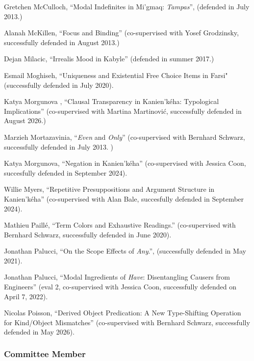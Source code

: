 \documentclass[11pt]{article}
\begin{document}

Gretchen McCulloch, ``Modal Indefinites in Mi'gmaq: \textit{Tampas}'', (defended in July 2013.)

Alanah McKillen, ``Focus and Binding'' (co-supervised with Yosef
Grodzinsky, successfully defended in August 2013.)

Dejan Milacic, ``Irrealis Mood in Kabyle'' (defended in summer 2017.)

Esmail Moghiseh, ``Uniqueness and Existential Free Choice Items in Farsi" (successfully defended in July 2020).


Katya Morgunova , ``Clausal Transparency in Kanien'k\'{e}ha:
Typological Implications'' (co-supervised with Martina Martinovi\'{c}, successfully defended in August 2026.)


Marzieh Mortazavinia, ``\textit{Even} and \textit{Only}''
(co-supervised with Bernhard Schwarz, successfully defended in July
2013. )

Katya Morgunova, ``Negation in Kanien'k\'eha'' (co-supervised with Jessica Coon, succesfully defended in September 2024).

Willie Myers, ``Repetitive Presuppositions and Argument Structure in Kanien'k\'eha'' (co-supervised with Alan Bale, succesfully defended in September 2024).

Mathieu Paill\'e, ``Term Colors and Exhaustive Readings.'' (co-supervised with Bernhard Schwarz, successfully defended in June 2020).

Jonathan Palucci, ``On the Scope Effects of \textit{Any}.'', (successfully defended in May 2021).

Jonathan Palucci, ``Modal Ingredients of \textit{Have}: Disentangling Causers from Engineers'' (eval 2, co-supervised with Jessica Coon, successfully defended on April 7, 2022).

Nicolas Poisson, ``Derived Object Predication: A New Type-Shifting Operation for Kind/Object Mismatches'' (co-supervised with Bernhard Schwarz, successfully defended in May 2026).







\subsubsection*{Committee Member}
\end{document}
